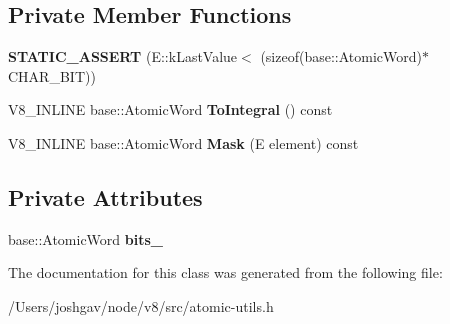 \subsection*{Private Member Functions}
\begin{DoxyCompactItemize}
\item 
{\bfseries S\+T\+A\+T\+I\+C\+\_\+\+A\+S\+S\+E\+RT} (E\+::k\+Last\+Value$<$ (sizeof(base\+::\+Atomic\+Word)$\ast$C\+H\+A\+R\+\_\+\+B\+IT))\hypertarget{classv8_1_1internal_1_1_atomic_enum_set_aab1804e4af523c9c55c6023378620983}{}\label{classv8_1_1internal_1_1_atomic_enum_set_aab1804e4af523c9c55c6023378620983}

\item 
V8\+\_\+\+I\+N\+L\+I\+NE base\+::\+Atomic\+Word {\bfseries To\+Integral} () const \hypertarget{classv8_1_1internal_1_1_atomic_enum_set_a8cfe57030edfa2f9bd6dbe5162bdbae7}{}\label{classv8_1_1internal_1_1_atomic_enum_set_a8cfe57030edfa2f9bd6dbe5162bdbae7}

\item 
V8\+\_\+\+I\+N\+L\+I\+NE base\+::\+Atomic\+Word {\bfseries Mask} (E element) const \hypertarget{classv8_1_1internal_1_1_atomic_enum_set_a73692735ec3cd3438118261f287c8213}{}\label{classv8_1_1internal_1_1_atomic_enum_set_a73692735ec3cd3438118261f287c8213}

\end{DoxyCompactItemize}
\subsection*{Private Attributes}
\begin{DoxyCompactItemize}
\item 
base\+::\+Atomic\+Word {\bfseries bits\+\_\+}\hypertarget{classv8_1_1internal_1_1_atomic_enum_set_a8ce8d3f59d7a8f04765411e079400fd9}{}\label{classv8_1_1internal_1_1_atomic_enum_set_a8ce8d3f59d7a8f04765411e079400fd9}

\end{DoxyCompactItemize}


The documentation for this class was generated from the following file\+:\begin{DoxyCompactItemize}
\item 
/\+Users/joshgav/node/v8/src/atomic-\/utils.\+h\end{DoxyCompactItemize}
